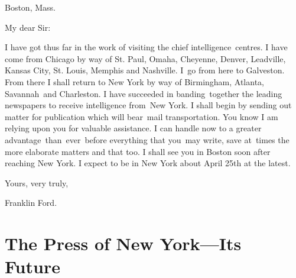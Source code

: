\documentclass[twoside,symmetric,nobib,justified]{tufte-book}
\let\oldchapter\chapter
\def\chapter{%
  \setcounter{footnote}{0}%
  \oldchapter
}
\begin{document}
\hspace{.15in} Boston, Mass.~

\vspace{.1in}

\noindent My dear Sir:~~

\vspace{.1in}

I have got thus far in the work of visiting the chief
intelligence~centres. I have come from Chicago by way of St. Paul,
Omaha, Cheyenne, Denver, Leadville, Kansas City, St. Louis, Memphis and
Nashville. I~go from here to Galveston. From there I shall return to New
York by way of Birmingham, Atlanta, Savannah~and Charleston. I have
succeeded in banding~together the leading newspapers to receive
intelligence from~New York. I shall begin by sending out matter for
publication which will bear~mail transportation. You know I am relying
upon you for valuable assistance. I can handle now to a greater
advantage~than~ever~before everything that you~may write, save at~times
the more elaborate matters and that too. I shall see you in Boston soon
after reaching New York. I expect to be in New York about April 25th at
the latest.~

\vspace{.15in}

\hfill Yours, very truly,~

\vspace{.05in}

\hfill Franklin Ford.~



\chapter[The Press of New York---Its Future]{The Press of New York---Its Future}
\label{ch:The Press of New York---Its Future}

\vspace{.2in}

\begin{LARGE}


\end{LARGE}

\vspace{0.5in}
\end{document}
